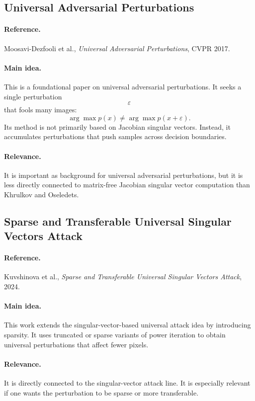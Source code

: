 \documentclass{article}
\begin{document}
\subsection{Universal Adversarial Perturbations}

\paragraph{Reference.}
Moosavi-Dezfooli et al., \emph{Universal Adversarial Perturbations}, CVPR 2017.

\paragraph{Main idea.}
This is a foundational paper on universal adversarial perturbations. It seeks a single perturbation
\[
\varepsilon
\]
that fools many images:
\[
\arg\max p(x)
\neq
\arg\max p(x+\varepsilon).
\]
Its method is not primarily based on Jacobian singular vectors. Instead, it accumulates perturbations that push samples across decision boundaries.

\paragraph{Relevance.}
It is important as background for universal adversarial perturbations, but it is less directly connected to matrix-free Jacobian singular vector computation than Khrulkov and Oseledets.

\subsection{Sparse and Transferable Universal Singular Vectors Attack}

\paragraph{Reference.}
Kuvshinova et al., \emph{Sparse and Transferable Universal Singular Vectors Attack}, 2024.

\paragraph{Main idea.}
This work extends the singular-vector-based universal attack idea by introducing sparsity. It uses truncated or sparse variants of power iteration to obtain universal perturbations that affect fewer pixels.

\paragraph{Relevance.}
It is directly connected to the singular-vector attack line. It is especially relevant if one wants the perturbation to be sparse or more transferable.
\end{document}
